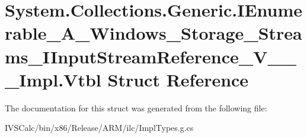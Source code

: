 \hypertarget{struct_system_1_1_collections_1_1_generic_1_1_i_enumerable___a___windows___storage___streams___if128f002873bbccd6ef136d01d28b2a6}{}\section{System.\+Collections.\+Generic.\+I\+Enumerable\+\_\+\+A\+\_\+\+Windows\+\_\+\+Storage\+\_\+\+Streams\+\_\+\+I\+Input\+Stream\+Reference\+\_\+\+V\+\_\+\+\_\+\+\_\+\+Impl.\+Vtbl Struct Reference}
\label{struct_system_1_1_collections_1_1_generic_1_1_i_enumerable___a___windows___storage___streams___if128f002873bbccd6ef136d01d28b2a6}


The documentation for this struct was generated from the following file\+:\begin{DoxyCompactItemize}
\item 
I\+V\+S\+Calc/bin/x86/\+Release/\+A\+R\+M/ilc/Impl\+Types.\+g.\+cs\end{DoxyCompactItemize}
